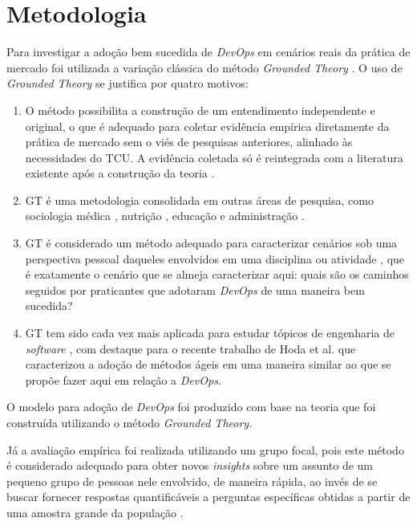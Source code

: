 \section{Metodologia}

Para investigar a adoção bem sucedida de \textit{DevOps} em cenários reais da
prática de mercado foi utilizada a variação clássica do método \textit{Grounded
Theory} \cite{glaser1967discovery}. O uso de \textit{Grounded Theory} se
justifica por quatro motivos:

\begin{enumerate}

\item O método possibilita a construção de um entendimento independente e original,
o que é adequado para coletar evidência empírica diretamente da prática de
mercado sem o viés de pesquisas anteriores, alinhado às necessidades do \acrshort{TCU}.
A evidência coletada só é reintegrada com a literatura existente após a
construção da teoria \cite{reconciling_perspectives,stol2016grounded}.

\item \acrshort{GT} é uma metodologia consolidada em outras áreas de
pesquisa, como sociologia médica \cite{gt_medical_sociology}, nutrição
\cite{gt_nursing}, educação \cite{gt_education} e administração
\cite{gt_management,locke2001grounded}.

\item \acrshort{GT} é considerado um método adequado para caracterizar cenários
sob uma perspectiva pessoal daqueles envolvidos em uma disciplina ou atividade \cite{stol2016grounded},
que é exatamente o cenário que se almeja caracterizar aqui: quais são os caminhos
seguidos por praticantes que adotaram \textit{DevOps} de uma maneira bem sucedida?

\item \acrshort{GT} tem sido cada vez mais aplicada para estudar tópicos de
engenharia de \textit{software} \cite{hoda2017becoming,Waterman:2015:ICSE,stol2016grounded},
com destaque para o recente trabalho de Hoda et al. \cite{hoda2017becoming} que
caracterizou a adoção de métodos ágeis em uma maneira similar ao que se propõe
fazer aqui em relação a \textit{DevOps}.

\end{enumerate}

O modelo para adoção de \textit{DevOps} foi produzido com base na teoria
que foi construída utilizando o método \textit{Grounded Theory}.

Já a avaliação empírica foi realizada utilizando um grupo focal, pois este
método é considerado adequado para obter novos \textit{insights} sobre um
assunto de um pequeno grupo de pessoas nele envolvido, de maneira rápida, ao
invés de se buscar fornecer respostas quantificáveis a perguntas específicas
obtidas a partir de uma amostra grande da população \cite{focus_group_handbook,shull2007guide}.

